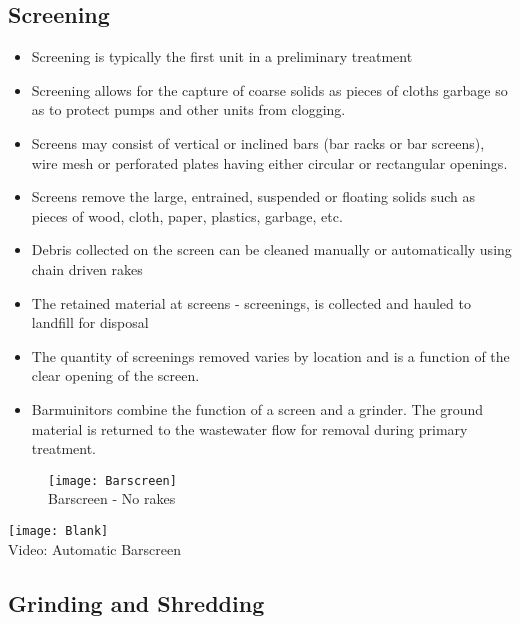 		\subsection{Screening}
					\begin{itemize}
						\item Screening is typically the first unit in a preliminary treatment
						\item Screening allows for the capture of coarse solids as pieces of cloths garbage so as to protect pumps and other units from clogging. 
						\item Screens may consist of vertical or inclined bars (bar racks or bar screens), wire mesh or perforated plates having either circular or rectangular openings. 
						\item Screens remove the large, entrained, suspended or floating solids such as pieces of wood, cloth, paper, plastics, garbage, etc.
						\item Debris collected on the screen can be cleaned manually or automatically using chain driven rakes 
						\item The retained material at screens - screenings, is collected and hauled to landfill for disposal
						\item The quantity of screenings removed varies by location and is a function of the clear opening of the screen.
						\item Barmuinitors combine the function of a screen and a grinder.  The ground material is returned to the wastewater flow for removal during primary treatment.
					\end{itemize}

\begin{figure}[h]
\begin{center}
    \texttt{[image: Barscreen]}\\

Barscreen - No rakes
\end{center}
  \end{figure}
  
 \begin{center}
    \texttt{[image: Blank]}\\
\hspace{0cm} Video: Automatic Barscreen
  \end{center}
 
		\subsection{Grinding and Shredding}

